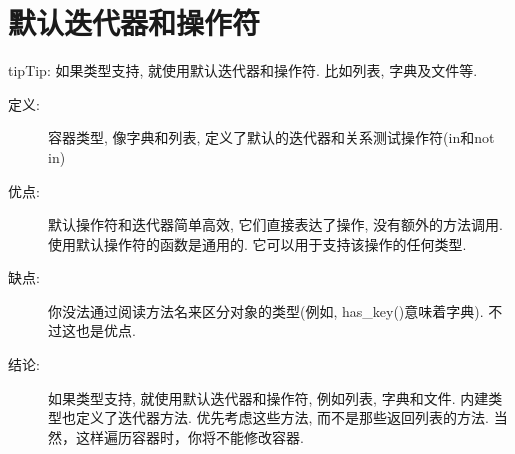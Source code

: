 \documentclass[a4paper,10pt,english]{sphinxmanual}
\begin{document}
\section{默认迭代器和操作符}
\label{\detokenize{python_language_rules:id6}}
\begin{sphinxadmonition}{tip}{Tip:}
如果类型支持, 就使用默认迭代器和操作符. 比如列表, 字典及文件等.
\end{sphinxadmonition}
\begin{description}
\item[{定义:}] \leavevmode
容器类型, 像字典和列表, 定义了默认的迭代器和关系测试操作符(in和not in)

\item[{优点:}] \leavevmode
默认操作符和迭代器简单高效, 它们直接表达了操作, 没有额外的方法调用. 使用默认操作符的函数是通用的. 它可以用于支持该操作的任何类型.

\item[{缺点:}] \leavevmode
你没法通过阅读方法名来区分对象的类型(例如, has\_key()意味着字典). 不过这也是优点.

\item[{结论:}] \leavevmode
如果类型支持, 就使用默认迭代器和操作符, 例如列表, 字典和文件. 内建类型也定义了迭代器方法. 优先考虑这些方法, 而不是那些返回列表的方法. 当然，这样遍历容器时，你将不能修改容器.

%
\begin{sphinxVerbatim}[commandchars=\\\{\}]
      
           
          
          
           
\end{sphinxVerbatim}

%
\begin{sphinxVerbatim}[commandchars=\\\{\}]
       
         
          
\end{sphinxVerbatim}

\end{description}
\end{document}
